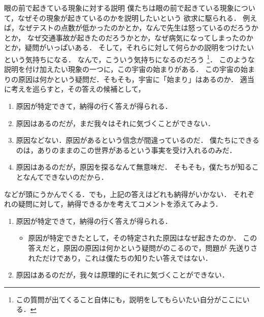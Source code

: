         \begin{memo}{眼の前で起きている現象に対する説明}
            僕たちは眼の前で起きている現象について，なぜその現象が起きているのかを説明したいという
            欲求に駆られる．
            例えば，なぜテストの点数が低かったのかとか，なんで先生は怒っているのだろうかとか，
            なぜ交通事故が起きたのだろうかとか，なぜ病気になってしまったのかとか，疑問がいっぱいある．
            そして，それらに対して何らかの説明をつけたいという気持ちになる．
            なんで，こういう気持ちになるのだろう
                \footnote{
                    この質問が出てくること自体にも，説明をしてもらいたい自分がここにいる．
                }．
            このような説明を付け加えたい現象の一つに，この宇宙の始まりがある．
            この宇宙の始まりの原因は何かという疑問だ．そもそも，宇宙に「始まり」はあるのか．
            適当に考えを巡らすと，その答えの候補として，
                \begin{enumerate}
                    \item 原因が特定できて，納得の行く答えが得られる．
                    \item 原因はあるのだが，まだ我々はそれに気づくことができない．
                    \item 原因などない．原因があるという信念が間違っているのだ．
                        僕たちにできるのは，ありのままのこの世界があるという事実を受け入れるのみだ．
                    \item 原因はあるのだが，原因を探るなんて無意味だ．
                        そもそも，僕たちが知ることなんてできないのだから．
                \end{enumerate}
            などが頭にうかんでくる．でも，上記の答えはどれも納得がいかない．
            それぞれの疑問に対して，納得できるかを考えてコメントを添えてみよう．
            \begin{enumerate}
                \item 原因が特定できて，納得の行く答えが得られる．
                    \begin{itemize}
                        \item 原因が特定できたとして，その特定された原因はなぜ起きたのか．
                            この答えだと，原因の原因は何かという疑問がのこるので，問題が
                            先送りされただけであり，これは僕たちの知りたい答えではない．
                    \end{itemize}
                \item 原因はあるのだが，我々は原理的にそれに気づくことができない．

\end{enumerate}
\end{memo}
